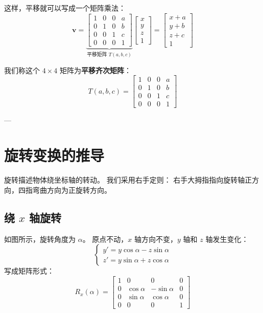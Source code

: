 \documentclass[12pt,a4paper]{article}
\begin{document}
这样，平移就可以写成一个矩阵乘法：
\[
\boldsymbol{v} =
\underbrace{
\begin{bmatrix}
1 & 0 & 0 & a \\
0 & 1 & 0 & b \\
0 & 0 & 1 & c \\
0 & 0 & 0 & 1
\end{bmatrix}
}_{\text{平移矩阵 } T(a,b,c)}
\begin{bmatrix}
x \\ y \\ z \\ 1
\end{bmatrix}
=
\begin{bmatrix}
x+a \\ y+b \\ z+c \\ 1
\end{bmatrix}
\]

我们称这个 \(4\times4\) 矩阵为\textbf{平移齐次矩阵}：
\[
T(a,b,c) = 
\begin{bmatrix}
1 & 0 & 0 & a \\
0 & 1 & 0 & b \\
0 & 0 & 1 & c \\
0 & 0 & 0 & 1
\end{bmatrix}
\]

---

\section{旋转变换的推导}
旋转描述物体绕坐标轴的转动。  
我们采用右手定则：  
右手大拇指指向旋转轴正方向，四指弯曲方向为正旋转方向。

\subsection{绕 $x$ 轴旋转}
如图所示，旋转角度为 $\alpha$。  
原点不动，$x$ 轴方向不变，$y$ 轴和 $z$ 轴发生变化：
\[
\begin{cases}
y' = y\cos\alpha - z\sin\alpha \\
z' = y\sin\alpha + z\cos\alpha
\end{cases}
\]
写成矩阵形式：
\[
R_x(\alpha) =
\begin{bmatrix}
1 & 0 & 0 & 0\\
0 & \cos\alpha & -\sin\alpha & 0\\
0 & \sin\alpha & \cos\alpha & 0\\
0 & 0 & 0 & 1
\end{bmatrix}
\]
\end{document}
